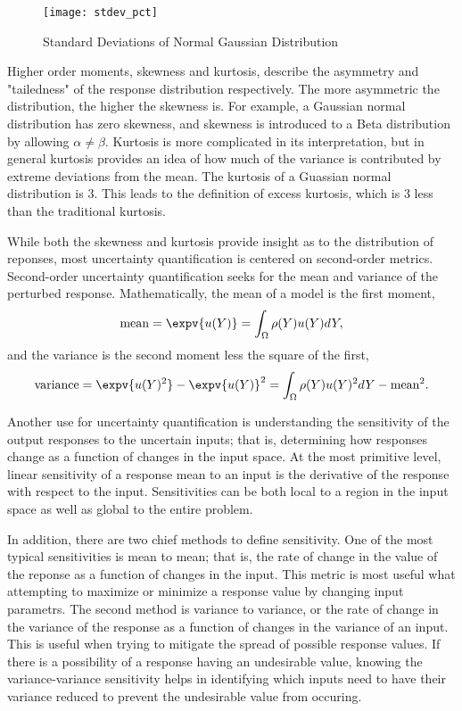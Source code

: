 \begin{figure}[H]
  \centering
  \texttt{[image: stdev\_pct]}
  \caption{Standard Deviations of Normal Gaussian Distribution}
  \label{fig:stdev pct}
\end{figure}
Higher order moments, skewness and kurtosis, describe the asymmetry and "tailedness"
of the response distribution respectively.  The more asymmetric the distribution, the
higher the skewness is.  For example, a Gaussian normal distribution has zero skewness,
and skewness is introduced to a Beta distribution by allowing $\alpha\neq\beta$.
Kurtosis is more complicated in its interpretation, but in general kurtosis provides an idea
of how much of the variance is contributed by extreme deviations from the mean.  The kurtosis
of a Guassian normal distribution is 3.  This leads to the definition of excess kurtosis,
which is 3 less than the traditional kurtosis.

While both the skewness and kurtosis provide insight as to the distribution of reponses,
most uncertainty quantification is centered on second-order metrics.
Second-order uncertainty quantification seeks for the mean and variance of
the perturbed response.  Mathematically, the mean of a model is the first moment,
\begin{equation}
  \text{mean} = \expv{u(Y)} = \int_\Omega \rho(Y) u(Y) dY,
\end{equation}
and the variance is the second moment less the square of the first,
\begin{equation}
  \text{variance} = \expv{u(Y)^2} - \expv{u(Y)}^2 = \int_\Omega \rho(Y) u(Y)^2 dY - \text{mean}^2.
\end{equation}
 
Another use for uncertainty quantification is understanding the sensitivity of the output responses to the
uncertain inputs; that is, determining how responses change as a function of changes in the input space.  At
the most primitive level, linear sensitivity of a response mean to an input is the derivative of the response
with respect to the input.  Sensitivities can be both local to a region in the input space as well as global
to the entire problem.

In addition, there are two chief methods to define sensitivity.  One of the most typical sensitivities
is mean to mean; that is, the rate of change in the value of the reponse as a function of changes in the
input.  This metric is most useful what attempting to maximize or minimize a response value by changing
input parametrs.  The second method is variance to variance, or the rate of change in the variance of the
response as a function of changes in the variance of an input.  This is useful when trying to mitigate the
spread of possible response values.  If there is a possibility of a response having an undesirable value,
knowing the variance-variance sensitivity helps in identifying which inputs need to have their variance
reduced to prevent the undesirable value from occuring.

